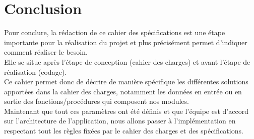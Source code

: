 \documentclass[a4]{article}
\begin{document}
	
		
	
	\section{Conclusion}
	
	Pour conclure, la rédaction de ce cahier des spécifications est une étape importante pour la réalisation du projet
	et plus précisément permet d'indiquer comment réaliser le besoin.\\
	
	Elle se situe après l'étape de conception (cahier des charges) et avant l'étape de réalisation (codage).\\
	
	Ce cahier permet donc de décrire de manière spécifique les différentes solutions apportées dans la cahier des charges, notamment les données en entrée
	ou en sortie des fonctions/procédures qui composent nos modules.\\
	
	Maintenant que tout ces paramètres ont été définis et que l'équipe est d'accord sur l'architecture de l'application, nous allons
	passer à l'implémentation en respectant tout les règles fixées par le cahier des charges et des spécifications.
	
\end{document}
